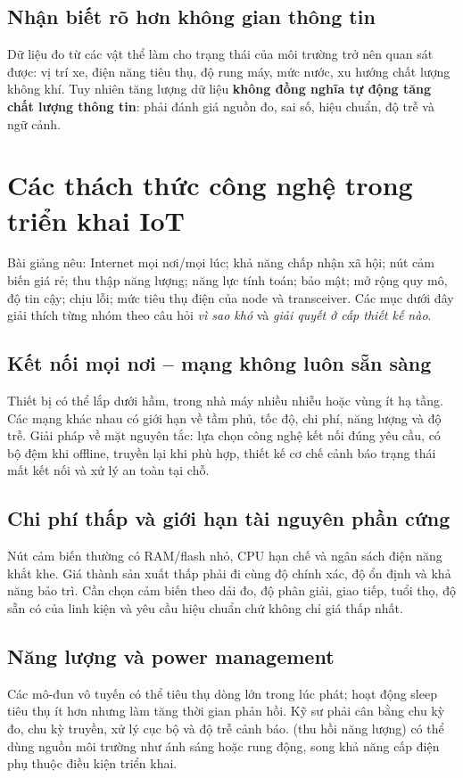 \subsection{Nhận biết rõ hơn không gian thông tin}
Dữ liệu đo từ các vật thể làm cho trạng thái của môi trường trở nên quan sát được: vị trí xe, điện năng tiêu thụ, độ rung máy, mức nước, xu hướng chất lượng không khí. Tuy nhiên tăng lượng dữ liệu \textbf{không đồng nghĩa tự động tăng chất lượng thông tin}: phải đánh giá nguồn đo, sai số, hiệu chuẩn, độ trễ và ngữ cảnh.

\section{Các thách thức công nghệ trong triển khai IoT}
Bài giảng nêu: Internet mọi nơi/mọi lúc; khả năng chấp nhận xã hội; nút cảm biến giá rẻ; thu thập năng lượng; năng lực tính toán; bảo mật; mở rộng quy mô, độ tin cậy; chịu lỗi; mức tiêu thụ điện của node và transceiver. Các mục dưới đây giải thích từng nhóm theo câu hỏi \emph{vì sao khó} và \emph{giải quyết ở cấp thiết kế nào}.

\subsection{Kết nối mọi nơi -- mạng không luôn sẵn sàng}
Thiết bị có thể lắp dưới hầm, trong nhà máy nhiều nhiễu hoặc vùng ít hạ tầng. Các mạng khác nhau có giới hạn về tầm phủ, tốc độ, chi phí, năng lượng và độ trễ. Giải pháp về mặt nguyên tắc: lựa chọn công nghệ kết nối đúng yêu cầu, có bộ đệm khi offline, truyền lại khi phù hợp, thiết kế cơ chế cảnh báo trạng thái mất kết nối và xử lý an toàn tại chỗ.
\subsection{Chi phí thấp và giới hạn tài nguyên phần cứng}
Nút cảm biến thường có RAM/flash nhỏ, CPU hạn chế và ngân sách điện năng khắt khe. Giá thành sản xuất thấp phải đi cùng độ chính xác, độ ổn định và khả năng bảo trì. Cần chọn cảm biến theo dải đo, độ phân giải, giao tiếp, tuổi thọ, độ sẵn có của linh kiện và yêu cầu hiệu chuẩn chứ không chỉ giá thấp nhất.
\subsection{Năng lượng và power management}
Các mô-đun vô tuyến có thể tiêu thụ dòng lớn trong lúc phát; hoạt động sleep tiêu thụ ít hơn nhưng làm tăng thời gian phản hồi. Kỹ sư phải cân bằng chu kỳ đo, chu kỳ truyền, xử lý cục bộ và độ trễ cảnh báo.  (thu hồi năng lượng) có thể dùng nguồn môi trường như ánh sáng hoặc rung động, song khả năng cấp điện phụ thuộc điều kiện triển khai.

